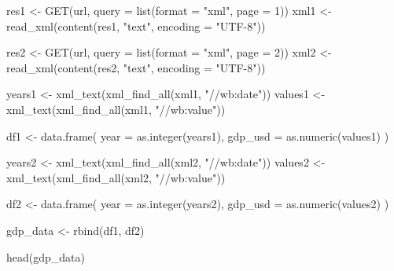 \documentclass[
  letterpaper,
  DIV=11,
  numbers=noendperiod]{scrreprt}
\newenvironment{Shaded}{\begin{snugshade}}{\end{snugshade}}
\newcommand{\AttributeTok}[1]{\textcolor[rgb]{0.40,0.45,0.13}{#1}}
\newcommand{\DecValTok}[1]{\textcolor[rgb]{0.68,0.00,0.00}{#1}}
\newcommand{\FunctionTok}[1]{\textcolor[rgb]{0.28,0.35,0.67}{#1}}
\newcommand{\NormalTok}[1]{\textcolor[rgb]{0.00,0.23,0.31}{#1}}
\newcommand{\OtherTok}[1]{\textcolor[rgb]{0.00,0.23,0.31}{#1}}
\newcommand{\StringTok}[1]{\textcolor[rgb]{0.13,0.47,0.30}{#1}}
\begin{document}
\begin{Shaded}
\begin{Highlighting}[]
\NormalTok{res1 }\OtherTok{\textless{}{-}} \FunctionTok{GET}\NormalTok{(url, }\AttributeTok{query =} \FunctionTok{list}\NormalTok{(}\AttributeTok{format =} \StringTok{"xml"}\NormalTok{, }\AttributeTok{page =} \DecValTok{1}\NormalTok{))}
\NormalTok{xml1 }\OtherTok{\textless{}{-}}  \FunctionTok{read\_xml}\NormalTok{(}\FunctionTok{content}\NormalTok{(res1, }\StringTok{"text"}\NormalTok{, }\AttributeTok{encoding =} \StringTok{"UTF{-}8"}\NormalTok{))}

\NormalTok{res2 }\OtherTok{\textless{}{-}} \FunctionTok{GET}\NormalTok{(url, }\AttributeTok{query =} \FunctionTok{list}\NormalTok{(}\AttributeTok{format =} \StringTok{"xml"}\NormalTok{, }\AttributeTok{page =} \DecValTok{2}\NormalTok{))}
\NormalTok{xml2 }\OtherTok{\textless{}{-}}  \FunctionTok{read\_xml}\NormalTok{(}\FunctionTok{content}\NormalTok{(res2, }\StringTok{"text"}\NormalTok{, }\AttributeTok{encoding =} \StringTok{"UTF{-}8"}\NormalTok{))}

\NormalTok{years1 }\OtherTok{\textless{}{-}} \FunctionTok{xml\_text}\NormalTok{(}\FunctionTok{xml\_find\_all}\NormalTok{(xml1, }\StringTok{"//wb:date"}\NormalTok{))}
\NormalTok{values1 }\OtherTok{\textless{}{-}} \FunctionTok{xml\_text}\NormalTok{(}\FunctionTok{xml\_find\_all}\NormalTok{(xml1, }\StringTok{"//wb:value"}\NormalTok{))}

\NormalTok{df1 }\OtherTok{\textless{}{-}} \FunctionTok{data.frame}\NormalTok{(}
  \AttributeTok{year =} \FunctionTok{as.integer}\NormalTok{(years1),}
  \AttributeTok{gdp\_usd =} \FunctionTok{as.numeric}\NormalTok{(values1)}
\NormalTok{)}

\NormalTok{years2 }\OtherTok{\textless{}{-}} \FunctionTok{xml\_text}\NormalTok{(}\FunctionTok{xml\_find\_all}\NormalTok{(xml2, }\StringTok{"//wb:date"}\NormalTok{))}
\NormalTok{values2 }\OtherTok{\textless{}{-}} \FunctionTok{xml\_text}\NormalTok{(}\FunctionTok{xml\_find\_all}\NormalTok{(xml2, }\StringTok{"//wb:value"}\NormalTok{))}

\NormalTok{df2 }\OtherTok{\textless{}{-}} \FunctionTok{data.frame}\NormalTok{(}
  \AttributeTok{year =} \FunctionTok{as.integer}\NormalTok{(years2),}
  \AttributeTok{gdp\_usd =} \FunctionTok{as.numeric}\NormalTok{(values2)}
\NormalTok{)}

\NormalTok{gdp\_data }\OtherTok{\textless{}{-}} \FunctionTok{rbind}\NormalTok{(df1, df2)}

\FunctionTok{head}\NormalTok{(gdp\_data)}
\end{Highlighting}
\end{Shaded}
\end{document}
